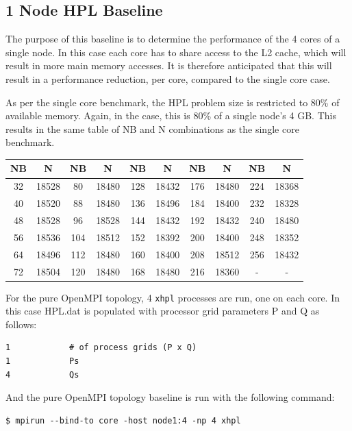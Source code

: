\documentclass{report}
\begin{document}
%
%
\subsection{1 Node HPL Baseline}

The purpose of this baseline is to determine the performance of the 4 cores of a single node. In this case each core has to share access to the L2 cache, which will result in more main memory accesses. It is therefore anticipated that this will result in a performance reduction, per core, compared to the single core case.

As per the single core benchmark, the HPL problem size is restricted to 80\% of available memory. Again, in the case, this is 80\% of a single node's 4 GB. This results in the same table of NB and N combinations as the single core benchmark.

\begin{center}
	\begin{tabular}{ |c|c|c|c|c|c|c|c|c|c| } 
		\hline
		NB & N & NB & N & NB & N & NB & N & NB & N \\ 
		\hline
		32 & 18528 &  80 & 18480 & 128 & 18432 & 176 & 18480 & 224 & 18368 \\ 
		40 & 18520 &  88 & 18480 & 136 & 18496 & 184 & 18400 & 232 & 18328 \\ 
 		48 & 18528 &  96 & 18528 & 144 & 18432 & 192 & 18432 & 240 & 18480 \\
		56 & 18536 & 104 & 18512 & 152 & 18392 & 200 & 18400 & 248 & 18352 \\ 
 		64 & 18496 & 112 & 18480 & 160 & 18400 & 208 & 18512 & 256 & 18432 \\
		72 & 18504 & 120 & 18480 & 168 & 18480 & 216 & 18360 &   - &     - \\ 
 		\hline
	\end{tabular}
\end{center}

For the pure OpenMPI topology, 4 \verb|xhpl| processes are run, one on each core. In this case HPL.dat is populated with processor grid parameters P and Q as follows:

\lstset{style=listing}
\begin{lstlisting}[numbers=none]
1            # of process grids (P x Q)
1            Ps
4            Qs
\end{lstlisting}

And the pure OpenMPI topology baseline is run with the following command:

\lstset{style=type}
\begin{lstlisting}[]
$ mpirun --bind-to core -host node1:4 -np 4 xhpl
\end{lstlisting}
\end{document}
